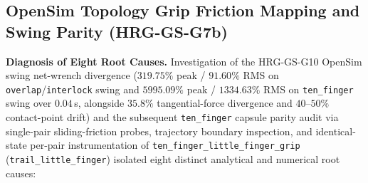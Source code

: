 \documentclass[11pt,a4paper]{article}
\begin{document}
\subsection{OpenSim Topology Grip Friction Mapping and Swing Parity (HRG-GS-G7b)}
\label{sec:hrg-gs-g7b}
\textbf{Diagnosis of Eight Root Causes.} Investigation of the HRG-GS-G10 OpenSim swing net-wrench divergence ($319.75\%$ peak / $91.60\%$ RMS on \texttt{overlap}/\texttt{interlock} swing and $5995.09\%$ peak / $1334.63\%$ RMS on \texttt{ten\_finger} swing over $0.04$\,s, alongside $35.8\%$ tangential-force divergence and $40\text{--}50\%$ contact-point drift) and the subsequent \texttt{ten\_finger} capsule parity audit via single-pair sliding-friction probes, trajectory boundary inspection, and identical-state per-pair instrumentation of \texttt{ten\_finger\_little\_finger\_grip} (\texttt{trail\_little\_finger}) isolated eight distinct analytical and numerical root causes:
\end{document}
